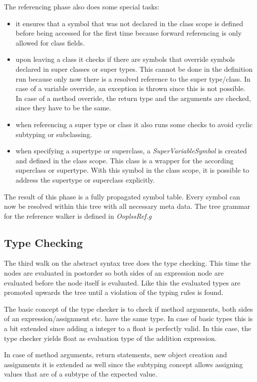 \noindent The referencing phase also does some special tasks:
\begin{itemize}
\item it ensures that a symbol that was not declared in the class scope is
defined before being accessed for the first time because forward referencing
is only allowed for class fields.
\item upon leaving a class it checks if there are symbols that override symbols
declared in super classes or super types. This cannot be done in the definition
run because only now there is a resolved reference to the super type/class.
In case of a variable override, an exception is thrown since this is not
possible. In case of a method override, the return type and the arguments
are checked, since they have to be the same.
\item when referencing a super type or class it also runs some checks to avoid
cyclic subtyping or subclassing.
\item when specifying a supertype or superclass, a \emph{SuperVariableSymbol}
is created and defined in the class scope. This class is a wrapper for the
according superclass or supertype. With this symbol in the class scope, it
is possible to address the supertype or superclass explicitly.
\end{itemize}

The result of this phase is a fully propagated symbol table. Every symbol can
now be resolved within this tree with all necessary meta data. The tree grammar
for the reference walker is defined in \emph{OoplssRef.g}

\subsection{Type Checking}
The third walk on the abstract syntax tree does the type checking. This
time the nodes are evaluated in postorder so both sides of an expression
node are evaluated before the node itself is evaluated. Like this the
evaluated types are promoted upwards the tree until a violation of the
typing rules is found.

The basic concept of the type checker is to check if method arguments,
both sides of an expression/assignment etc. have the same type. In case
of basic types this is a bit extended since adding a integer to a float
is perfectly valid. In this case, the type checker yields float as
evaluation type of the addition expression.

In case of method arguments, return statements, new object creation
and assignments it is extended as well since the subtyping concept
allows assigning values that are of a subtype of the expected value.\\

